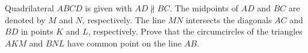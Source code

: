 Quadrilateral $ABCD$ is given with $AD \nparallel BC$. The midpoints of $AD$ and $BC$ are denoted by $M$ and $N$,  respectively. The line $MN$ intersects the diagonals $AC$ and $BD$ in points $K$ and $L$,  respectively. Prove that the circumcircles of the triangles $AKM$ and $BNL$ have common point on the line $AB$.
